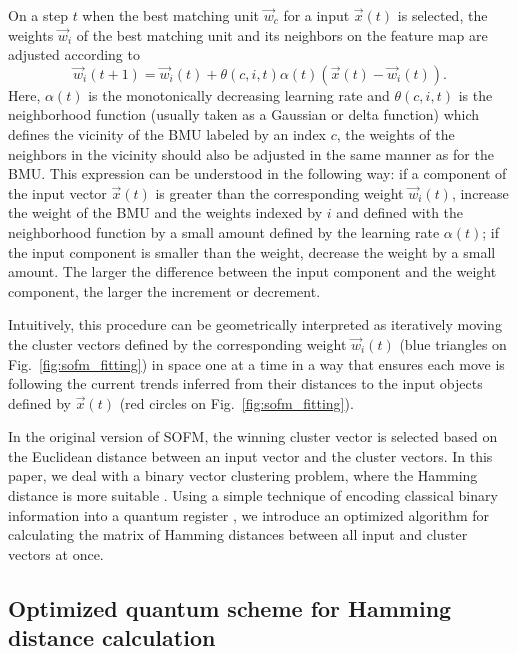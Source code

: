 \documentclass[pra,showkeys,twocolumn,showpacs]{revtex4-1}
\begin{document}
On a step $t$ when the best matching unit $\vec{w}_{c}$ for a input $\vec{x}(t)$ is selected,
the weights $\vec{w}_{i}$ of the best matching unit and its neighbors on the feature map are adjusted according to
%
\begin{equation}
    \label{eq:learning}
	\vec{w}_{i}(t + 1)
	= \vec{w}_{i}(t)
	+ \theta(c, i, t) \alpha(t)
		\left(\vec{x}(t) - \vec{w}_{i}(t)\right) .
\end{equation}
%
Here,  $\alpha(t)$ is the monotonically decreasing learning rate and $\theta(c, i, t)$ is the neighborhood function (usually taken as a Gaussian or delta function) which defines the vicinity of the BMU labeled by an index $c$, the weights of the neighbors in the vicinity should also be adjusted in the same manner as for the BMU. This expression can be understood in the following way: if a component of the input vector $\vec{x}(t)$ is greater than the corresponding weight $ \vec{w}_{i}(t) $, increase the weight of the BMU and the weights indexed by $i$ and defined with the neighborhood function by a small amount defined by the learning rate $\alpha(t)$; if the input component is smaller than the weight, decrease the weight by a small amount. The larger the difference between the input component and the weight component, the larger the increment or decrement.

Intuitively, this procedure can be geometrically interpreted as iteratively moving the cluster vectors defined by the corresponding weight $ \vec{w}_{i}(t) $ (blue triangles on Fig.~\ref{fig:sofm_fitting}) in space one at a time in a way that ensures each move is following the current trends inferred from their distances to the input objects defined by $\vec{x}(t)$ (red circles on Fig.~\ref{fig:sofm_fitting}).

In the original version of SOFM, the winning cluster vector is selected based on the Euclidean distance between an input vector and the cluster vectors. In this paper, we deal with a binary vector clustering problem, where the Hamming distance is more suitable \cite{appiah2009, santana2017}.
Using a simple technique of encoding classical binary information into a quantum register \cite{trugenberger2001},
we introduce an optimized algorithm for calculating the matrix of Hamming distances between all input and cluster vectors at once.







\subsection{Optimized quantum scheme for Hamming distance calculation}
\label{subsec:qcircuit}
\end{document}
